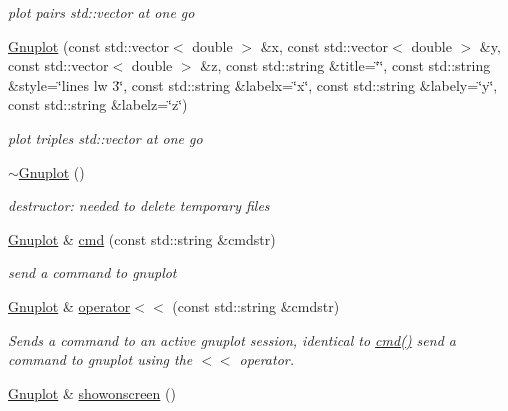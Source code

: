 \begin{DoxyCompactItemize}
\begin{DoxyCompactList}\small\item\em plot pairs std\-::vector at one go \end{DoxyCompactList}\item 
\hypertarget{classkukadu_1_1Gnuplot_a871b56fac856507973efb00861f7cd06}{\hyperlink{classkukadu_1_1Gnuplot_a871b56fac856507973efb00861f7cd06}{Gnuplot} (const std\-::vector$<$ double $>$ \&x, const std\-::vector$<$ double $>$ \&y, const std\-::vector$<$ double $>$ \&z, const std\-::string \&title=\char`\"{}\char`\"{}, const std\-::string \&style=\char`\"{}lines lw 3\char`\"{}, const std\-::string \&labelx=\char`\"{}x\char`\"{}, const std\-::string \&labely=\char`\"{}y\char`\"{}, const std\-::string \&labelz=\char`\"{}z\char`\"{})}\label{classkukadu_1_1Gnuplot_a871b56fac856507973efb00861f7cd06}

\begin{DoxyCompactList}\small\item\em plot triples std\-::vector at one go \end{DoxyCompactList}\item 
\hypertarget{classkukadu_1_1Gnuplot_a512e0f34eacae8a6a819b0b74fab029b}{\hyperlink{classkukadu_1_1Gnuplot_a512e0f34eacae8a6a819b0b74fab029b}{$\sim$\-Gnuplot} ()}\label{classkukadu_1_1Gnuplot_a512e0f34eacae8a6a819b0b74fab029b}

\begin{DoxyCompactList}\small\item\em destructor\-: needed to delete temporary files \end{DoxyCompactList}\item 
\hypertarget{classkukadu_1_1Gnuplot_a02945efc7719ceb26b97bdee6dfa0c76}{\hyperlink{classkukadu_1_1Gnuplot}{Gnuplot} \& \hyperlink{classkukadu_1_1Gnuplot_a02945efc7719ceb26b97bdee6dfa0c76}{cmd} (const std\-::string \&cmdstr)}\label{classkukadu_1_1Gnuplot_a02945efc7719ceb26b97bdee6dfa0c76}

\begin{DoxyCompactList}\small\item\em send a command to gnuplot \end{DoxyCompactList}\item 
\hyperlink{classkukadu_1_1Gnuplot}{Gnuplot} \& \hyperlink{classkukadu_1_1Gnuplot_a76d956598dab9d160127acf2c7d06e1f}{operator$<$$<$} (const std\-::string \&cmdstr)
\begin{DoxyCompactList}\small\item\em Sends a command to an active gnuplot session, identical to \hyperlink{classkukadu_1_1Gnuplot_a02945efc7719ceb26b97bdee6dfa0c76}{cmd()} send a command to gnuplot using the $<$$<$ operator. \end{DoxyCompactList}\item 
\hypertarget{classkukadu_1_1Gnuplot_a88c750479a441fe5e0113e7f795d6f42}{\hyperlink{classkukadu_1_1Gnuplot}{Gnuplot} \& \hyperlink{classkukadu_1_1Gnuplot_a88c750479a441fe5e0113e7f795d6f42}{showonscreen} ()}\label{classkukadu_1_1Gnuplot_a88c750479a441fe5e0113e7f795d6f42}


\end{DoxyCompactItemize}
